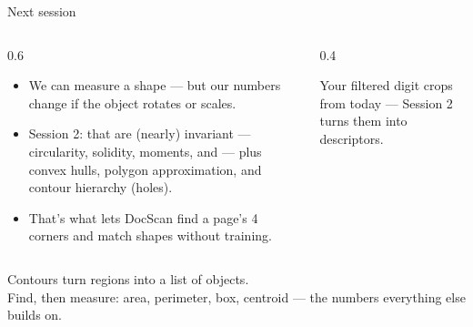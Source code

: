 \documentclass[10pt,aspectratio=169]{beamer}
\begin{document}
\begin{frame}{Next session}
  \begin{columns}[T]
    \begin{column}{0.6\textwidth}
      \begin{itemize}
        \item We can measure a shape — but our numbers change if the object rotates or scales.
        \item \alert{Session 2:}  that are (nearly) invariant — circularity,
              solidity, moments, and  — plus convex hulls, polygon approximation,
              and contour hierarchy (holes).
        \item That's what lets DocScan find a page's 4 corners and match shapes without training.
      \end{itemize}
    \end{column}
    \begin{column}{0.4\textwidth}
      \begin{infobox}[Bring]
        Your filtered digit crops from today — Session 2 turns them into descriptors.
      \end{infobox}
    \end{column}
  \end{columns}
\end{frame}

\begin{frame}[standout]
  Contours turn regions into a list of objects.\\[4pt]
  \normalsize Find, then measure: area, perimeter, box, centroid — the numbers everything else builds on.
\end{frame}
\end{document}
